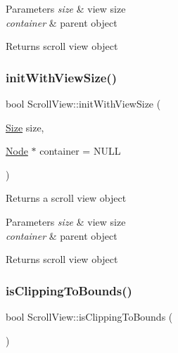 \begin{DoxyParams}{Parameters}
{\em size} & view size \\
\hline
{\em container} & parent object \\
\hline
\end{DoxyParams}
\begin{DoxyReturn}{Returns}
scroll view object 
\end{DoxyReturn}
\mbox{\label{classScrollView_ae672005fc1d0d8dd3605d85e9f41a1d4}} 
\subsubsection{\texorpdfstring{init\+With\+View\+Size()}{initWithViewSize()}\hspace{0.1cm}{\footnotesize\ttfamily [2/2]}}
{\footnotesize\ttfamily bool Scroll\+View\+::init\+With\+View\+Size (\begin{DoxyParamCaption}\item[{\hyperlink{classSize}{Size}}]{size,  }\item[{\hyperlink{classNode}{Node} $\ast$}]{container = {\ttfamily NULL} }\end{DoxyParamCaption})}

Returns a scroll view object


\begin{DoxyParams}{Parameters}
{\em size} & view size \\
\hline
{\em container} & parent object \\
\hline
\end{DoxyParams}
\begin{DoxyReturn}{Returns}
scroll view object 
\end{DoxyReturn}
\mbox{\label{classScrollView_a7c5e4247b97f795d120e68b1fbee751e}} 
\subsubsection{\texorpdfstring{is\+Clipping\+To\+Bounds()}{isClippingToBounds()}\hspace{0.1cm}{\footnotesize\ttfamily [1/2]}}
{\footnotesize\ttfamily bool Scroll\+View\+::is\+Clipping\+To\+Bounds (\begin{DoxyParamCaption}{ }\end{DoxyParamCaption})\hspace{0.3cm}{\ttfamily [inline]}}

